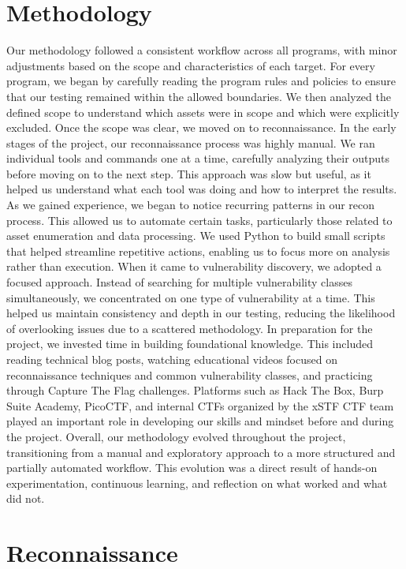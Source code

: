\documentclass[12pt,a4paper]{report}
\begin{document}
\chapter{Methodology}

Our methodology followed a consistent workflow across all programs, with minor adjustments based on the scope and characteristics of each target. For every program, we began by carefully reading the program rules and policies to ensure that our testing remained within the allowed boundaries. We then analyzed the defined scope to understand which assets were in scope and which were explicitly excluded.
Once the scope was clear, we moved on to reconnaissance. In the early stages of the project, our reconnaissance process was highly manual. We ran individual tools and commands one at a time, carefully analyzing their outputs before moving on to the next step. This approach was slow but useful, as it helped us understand what each tool was doing and how to interpret the results.
As we gained experience, we began to notice recurring patterns in our recon process. This allowed us to automate certain tasks, particularly those related to asset enumeration and data processing. We used Python to build small scripts that helped streamline repetitive actions, enabling us to focus more on analysis rather than execution.
When it came to vulnerability discovery, we adopted a focused approach. Instead of searching for multiple vulnerability classes simultaneously, we concentrated on one type of vulnerability at a time. This helped us maintain consistency and depth in our testing, reducing the likelihood of overlooking issues due to a scattered methodology.
In preparation for the project, we invested time in building foundational knowledge. This included reading technical blog posts, watching educational videos focused on reconnaissance techniques and common vulnerability classes, and practicing through Capture The Flag challenges. Platforms such as Hack The Box, Burp Suite Academy, PicoCTF, and internal CTFs organized by the xSTF CTF team played an important role in developing our skills and mindset before and during the project.
Overall, our methodology evolved throughout the project, transitioning from a manual and exploratory approach to a more structured and partially automated workflow. This evolution was a direct result of hands-on experimentation, continuous learning, and reflection on what worked and what did not.


\chapter{Reconnaissance}
\end{document}
